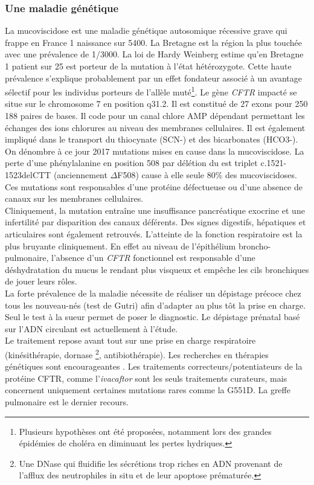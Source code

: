 \documentclass[12pt,a4paper]{article}
\begin{document}
\subsubsection{Une maladie génétique}
La mucoviscidose est une maladie génétique autosomique récessive grave qui frappe en France 1 naissance sur 5400\cite{Registredelamuco.org}. La Bretagne est la région la plus touchée avec une prévalence de 1/3000\cite{Registredelamuco.org}.
La loi de Hardy Weinberg estime qu’en Bretagne 1 patient sur 25 est porteur de la mutation à l’état hétérozygote. Cette haute prévalence s’explique probablement par un effet fondateur associé à un avantage sélectif pour les individus porteurs de l’allèle muté\footnote{Plusieurs hypothèses ont été proposées, notamment lors des grandes épidémies de choléra en diminuant les pertes hydriques.}.
Le gène \textit{CFTR} impacté se situe sur le chromosome 7 en position q31.2. Il est constitué de 27 exons pour 250 188\cite{OLeary2016} paires de bases. Il code pour un canal chlore AMP dépendant permettant les échanges des ions chlorures au niveau des membranes cellulaires. Il est également impliqué dans le transport du thiocynate (SCN-) et des bicarbonates (HCO3-)\cite{Quinton2001}.
On dénombre à ce jour 2017 mutations \cite{cftrdb} mises en cause dans la mucoviscidose. La perte d’une phénylalanine en position 508 par délétion du est triplet c.1521-1523delCTT (anciennement $\Delta$F508) cause à elle seule 80\% des mucoviscidoses\cite{cftrdb}.
Ces mutations sont responsables d’une protéine défectueuse ou d’une absence de canaux sur les membranes cellulaires. \\
Cliniquement, la mutation entraîne une insuffisance pancréatique exocrine et une infertilité par disparition des canaux déférents. Des signes digestifs, hépatiques et articulaires sont également retrouvés.
L'atteinte de la fonction respiratoire est la plus bruyante cliniquement. En effet au niveau de l’épithélium broncho-pulmonaire, l’absence d’un \textit{CFTR} fonctionnel est responsable d’une déshydratation du mucus le rendant plus visqueux et empêche les cils bronchiques de jouer leurs rôles.\\
La forte prévalence de la maladie nécessite de réaliser un dépistage précoce chez tous les nouveau-nés (test de Gutri) afin d’adapter au plus tôt la prise en charge. Seul le test à la sueur permet de poser le diagnostic. Le dépistage prénatal basé sur l’ADN circulant est actuellement à l’étude\cite{Guissart2017}.\\
Le traitement repose avant tout sur une prise en charge respiratoire (kinésithérapie, dornase \footnote{Une DNase qui fluidifie les sécrétions trop riches en ADN provenant de l'afflux des neutrophiles in situ et de leur apoptose prématurée.}, antibiothérapie). Les recherches en thérapies génétiques sont encourageantes \cite{Montier2004}.
Les traitements correcteurs/potentiateurs de la protéine CFTR, comme l'\textit{ivacaftor} sont les seuls traitements curateurs, mais concernent uniquement certaines mutations rares comme la G551D. La greffe pulmonaire est le dernier recours.
\end{document}
